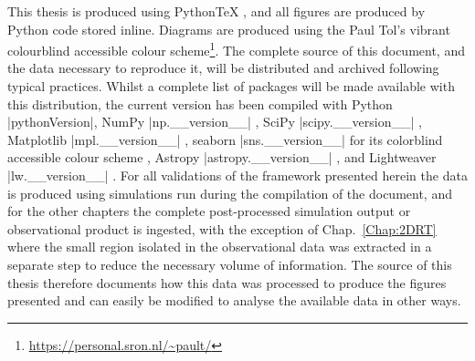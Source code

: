 This thesis is produced using PythonTeX \citep{Poore2015}, and all figures are produced by Python code stored inline.
Diagrams are produced using the Paul Tol's vibrant colourblind accessible colour scheme\footnote{\url{https://personal.sron.nl/~pault/}}.
The complete source of this document, and the data necessary to reproduce it, will be distributed and archived following typical practices.
Whilst a complete list of packages will be made available with this distribution, the current version has been compiled with Python \py[Intro]|pythonVersion|, NumPy \py[Intro]|np.__version__| \citep{Harris2020}, SciPy \py[Intro]|scipy.__version__| \citep{Virtanen2020}, Matplotlib \py[Intro]|mpl.__version__| \citep{Hunter2007}, seaborn \py[Intro]|sns.__version__| for its colorblind accessible colour scheme \citep{Waskom2021}, Astropy \py[Intro]|astropy.__version__| \citep{Robitaille2013,Price-Whelan2018}, and Lightweaver \py[Intro]|lw.__version__| \citep{Osborne2021}.
For all validations of the \Lw{} framework presented herein the data is produced using simulations run during the compilation of the document, and for the other chapters the complete post-processed simulation output or observational product is ingested, with the exception of Chap.~\ref{Chap:2DRT} where the small region isolated in the observational data was extracted in a separate step to reduce the necessary volume of information.
The source of this thesis therefore documents how this data was processed to produce the figures presented and can easily be modified to analyse the available data in other ways.

